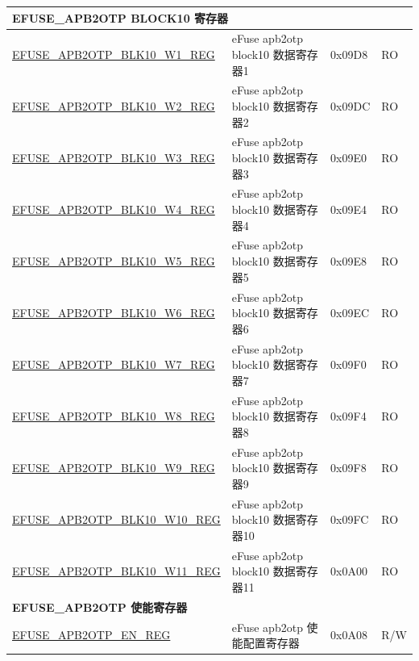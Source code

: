 \begin{longtable}{ | p{7cm} | p{6cm} | p{1.2cm} | p{1.5cm} | }
\multicolumn{4}{|l|}{\textbf{EFUSE\_APB2OTP BLOCK10 寄存器}} \\ \hline
\hyperref[regdesc:EFUSEAPB2OTPBLK10WNREG]{EFUSE\_APB2OTP\_BLK10\_W1\_REG} & eFuse apb2otp block10 数据寄存器1 & 0x09D8 & RO \\  \hline
\hyperref[regdesc:EFUSEAPB2OTPBLK10WNREG]{EFUSE\_APB2OTP\_BLK10\_W2\_REG} & eFuse apb2otp block10 数据寄存器2 & 0x09DC & RO \\\hline
\hyperref[regdesc:EFUSEAPB2OTPBLK10WNREG]{EFUSE\_APB2OTP\_BLK10\_W3\_REG} & eFuse apb2otp block10 数据寄存器3 & 0x09E0 & RO \\\hline
\hyperref[regdesc:EFUSEAPB2OTPBLK10WNREG]{EFUSE\_APB2OTP\_BLK10\_W4\_REG} & eFuse apb2otp block10 数据寄存器4 & 0x09E4 & RO \\\hline
\hyperref[regdesc:EFUSEAPB2OTPBLK10WNREG]{EFUSE\_APB2OTP\_BLK10\_W5\_REG} & eFuse apb2otp block10 数据寄存器5 & 0x09E8 & RO \\\hline
\hyperref[regdesc:EFUSEAPB2OTPBLK10WNREG]{EFUSE\_APB2OTP\_BLK10\_W6\_REG} & eFuse apb2otp block10 数据寄存器6 & 0x09EC & RO \\\hline
\hyperref[regdesc:EFUSEAPB2OTPBLK10WNREG]{EFUSE\_APB2OTP\_BLK10\_W7\_REG} & eFuse apb2otp block10 数据寄存器7 & 0x09F0 & RO \\\hline
\hyperref[regdesc:EFUSEAPB2OTPBLK10WNREG]{EFUSE\_APB2OTP\_BLK10\_W8\_REG} & eFuse apb2otp block10 数据寄存器8 & 0x09F4 & RO \\\hline
\hyperref[regdesc:EFUSEAPB2OTPBLK10WNREG]{EFUSE\_APB2OTP\_BLK10\_W9\_REG} & eFuse apb2otp block10 数据寄存器9 & 0x09F8 & RO \\\hline
\hyperref[regdesc:EFUSEAPB2OTPBLK10WNREG]{EFUSE\_APB2OTP\_BLK10\_W10\_REG} & eFuse apb2otp block10 数据寄存器10 & 0x09FC & RO \\ \hline
\hyperref[regdesc:EFUSEAPB2OTPBLK10WNREG]{EFUSE\_APB2OTP\_BLK10\_W11\_REG} & eFuse apb2otp block10 数据寄存器11 & 0x0A00 & RO \\\hline
\multicolumn{4}{|l|}{\textbf{EFUSE\_APB2OTP 使能寄存器}} \\ \hline
\hyperref[regdesc:EFUSEAPB2OTPENREG]{EFUSE\_APB2OTP\_EN\_REG} & eFuse apb2otp 使能配置寄存器 & 0x0A08 & R/W \\ \hline
\end{longtable}
